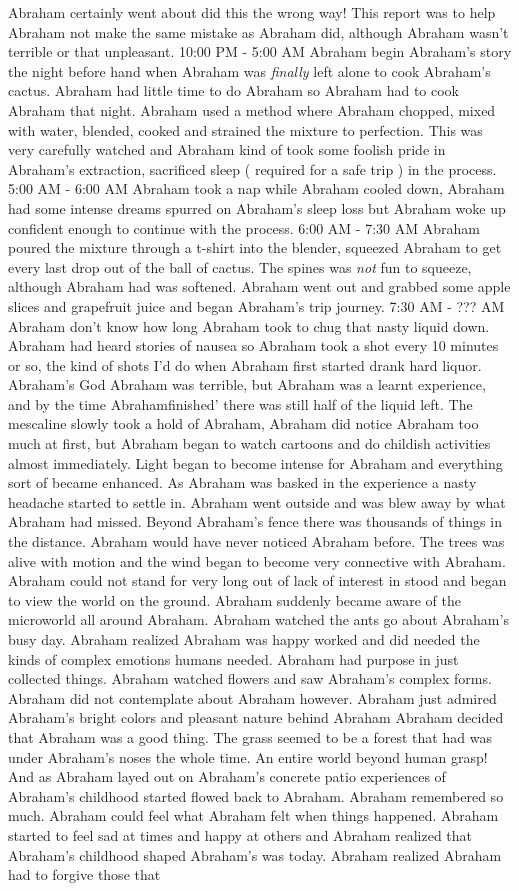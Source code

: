 \documentclass[12pt]{book}
\begin{document}
Abraham certainly went about did this the wrong way! This report was to help Abraham not make the same mistake as Abraham did, although Abraham wasn't terrible or that unpleasant. 10:00 PM - 5:00 AM Abraham begin Abraham's story the night before hand when Abraham was \emph{finally} left alone to cook Abraham's cactus. Abraham had little time to do Abraham so Abraham had to cook Abraham that night. Abraham used a method where Abraham chopped, mixed with water, blended, cooked and strained the mixture to perfection. This was very carefully watched and Abraham kind of took some foolish pride in Abraham's extraction, sacrificed sleep ( required for a safe trip ) in the process. 5:00 AM - 6:00 AM Abraham took a nap while Abraham cooled down, Abraham had some intense dreams spurred on Abraham's sleep loss but Abraham woke up confident enough to continue with the process. 6:00 AM - 7:30 AM Abraham poured the mixture through a t-shirt into the blender, squeezed Abraham to get every last drop out of the ball of cactus. The spines was \emph{not} fun to squeeze, although Abraham had was softened. Abraham went out and grabbed some apple slices and grapefruit juice and began Abraham's trip journey. 7:30 AM - ??? AM Abraham don't know how long Abraham took to chug that nasty liquid down. Abraham had heard stories of nausea so Abraham took a shot every 10 minutes or so, the kind of shots I'd do when Abraham first started drank hard liquor. Abraham's God Abraham was terrible, but Abraham was a learnt experience, and by the time Abrahamfinished' there was still half of the liquid left. The mescaline slowly took a hold of Abraham, Abraham did notice Abraham too much at first, but Abraham began to watch cartoons and do childish activities almost immediately. Light began to become intense for Abraham and everything sort of became enhanced. As Abraham was basked in the experience a nasty headache started to settle in. Abraham went outside and was blew away by what Abraham had missed. Beyond Abraham's fence there was thousands of things in the distance. Abraham would have never noticed Abraham before. The trees was alive with motion and the wind began to become very connective with Abraham. Abraham could not stand for very long out of lack of interest in stood and began to view the world on the ground. Abraham suddenly became aware of the microworld all around Abraham. Abraham watched the ants go about Abraham's busy day. Abraham realized Abraham was happy worked and did needed the kinds of complex emotions humans needed. Abraham had purpose in just collected things. Abraham watched flowers and saw Abraham's complex forms. Abraham did not contemplate about Abraham however. Abraham just admired Abraham's bright colors and pleasant nature behind Abraham Abraham decided that Abraham was a good thing. The grass seemed to be a forest that had was under Abraham's noses the whole time. An entire world beyond human grasp! And as Abraham layed out on Abraham's concrete patio experiences of Abraham's childhood started flowed back to Abraham. Abraham remembered so much. Abraham could feel what Abraham felt when things happened. Abraham started to feel sad at times and happy at others and Abraham realized that Abraham's childhood shaped Abraham's was today. Abraham realized Abraham had to forgive those that 
\end{document}
